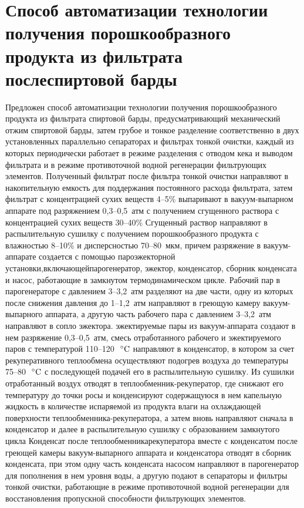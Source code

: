 \section{Способ автоматизации технологии получения порошкообразного продукта из фильтрата послеспиртовой барды}

Предложен способ автоматизации технологии получения порошкообразного продукта из фильтрата спиртовой барды, предусматривающий механический отжим спиртовой барды, затем грубое и тонкое разделение соответственно в двух установленных параллельно сепараторах и фильтрах тонкой очистки, каждый из которых периодически работает в режиме разделения с отводом кека и выводом фильтрата и в режиме противоточной водной регенерации фильтрующих элементов.
Полученный фильтрат после фильтра тонкой очистки направляют в накопительную емкость для поддержания постоянного расхода фильтрата, затем фильтрат с концентрацией сухих веществ 4--5\% выпаривают в вакуум-выпарном аппарате под разряжением 0,3--0,5~атм с получением сгущенного раствора с концентрацией сухих веществ 30--40\%
Сгущенный раствор направляют в распылительную сушилку с получением порошкообразного продукта с влажностью 8--10\% и дисперсностью 70--80~мкм, причем разряжение в вакуум-аппарате создается с помощью пароэжекторной установки,включающейпарогенератор, эжектор, конденсатор, сборник конденсата и насос, работающие в замкнутом термодинамическом цикле.
Рабочий пар в парогенераторе с давлением 3--3,2~атм разделяют на две части, одну из которых после снижения давления до 1--1,2~атм направляют в греющую камеру вакуум-выпарного аппарата, а другую часть рабочего пара с давлением 3--3,2~атм направляют в сопло эжектора.
эжектируемые пары из вакуум-аппарата создают в нем разряжение 0,3--0,5~атм, смесь отработанного рабочего и эжектируемого паров с температурой 110--120~\(\,^{\circ}\mathrm{C}\) направляют в конденсатор, в котором за счет рекуперативного теплообмена осуществляют подогрев воздуха до температуры 75--80~\(\,^{\circ}\mathrm{C}\) с последующей подачей его в распылительную сушилку.
Из сушилки отработанный воздух отводят в теплообменник-рекуператор, где снижают его температуру до точки росы и конденсируют содержащуюся в нем капельную жидкость в количестве испаряемой из продукта влаги на охлаждающей поверхности теплообменника-рекуператора, а затем вновь направляют сначала в конденсатор и далее в распылительную сушилку с образованием замкнутого цикла
Конденсат после теплообменникарекуператора вместе с конденсатом после греющей камеры вакуум-выпарного аппарата и конденсатора отводят в сборник конденсата, при этом одну часть конденсата насосом направляют в парогенератор для пополнения в нем уровня воды, а другую подают в сепараторы и фильтры тонкой очистки, работающие в режиме противоточной водной регенерации для восстановления пропускной способности фильтрующих элементов.
